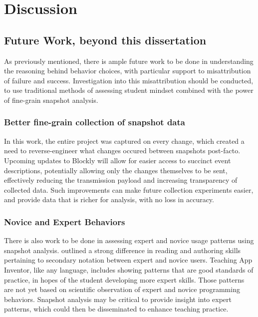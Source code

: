\chapter{Discussion}
	




\section{Future Work, beyond this dissertation} %
\label{sec:futurework}

As previously mentioned, there is ample future work to be done in understanding the reasoning behind behavior choices, with particular support to misattribution of failure and success. Investigation into this misattribution should be conducted, to use traditional methods of assessing student mindset combined with the power of fine-grain snapshot analysis. 

\subsection{Better fine-grain collection of snapshot data} 
In this work, the entire project was captured on every change, which created a need to reverse-engineer what changes occured between snapshots post-facto. Upcoming updates to Blockly will allow for easier access to succinct event descriptions, potentially allowing only the changes themselves to be sent, effectively reducing the transmission payload and increasing transparency of collected data. Such improvements can make future collection experiments easier, and provide data that is richer for analysis, with no loss in accuracy. 

\subsection{Novice and Expert Behaviors}
There is also work to be done in assessing expert and novice usage patterns using snapshot analysis. \cite{petre-1995} outlined a strong difference in reading and authoring skills pertaining to secondary notation between expert and novice users. Teaching App Inventor, like any language, includes showing patterns that are good standards of practice, in hopes of the student developing more expert skills. Those patterns are not yet based on scientific observation of expert and novice programming behaviors. Snapshot analysis may be critical to provide insight into expert patterns, which could then be disseminated to enhance teaching practice. 


